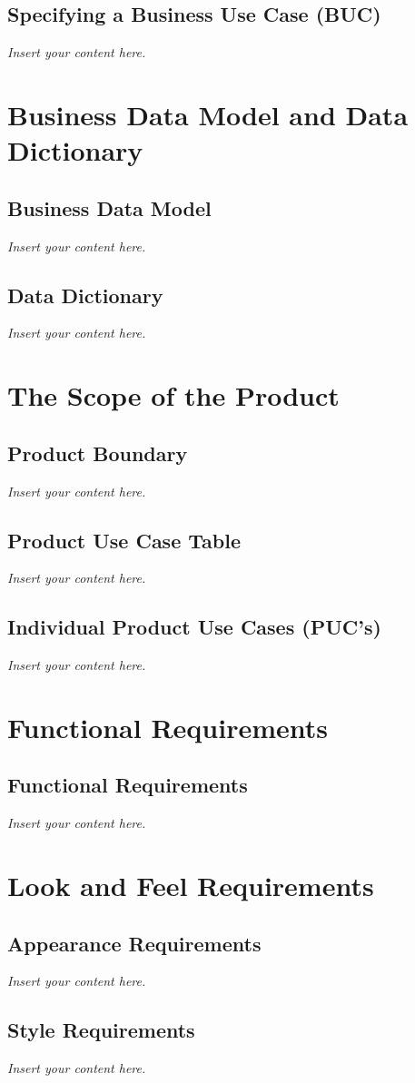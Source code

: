\documentclass[12pt]{article}
\newcommand{\lips}{\textit{Insert your content here.}}
\begin{document}
\subsection{Specifying a Business Use Case (BUC)}
\lips

\section{Business Data Model and Data Dictionary}
\subsection{Business Data Model}
\lips
\subsection{Data Dictionary}
\lips

\section{The Scope of the Product}
\subsection{Product Boundary}
\lips
\subsection{Product Use Case Table}
\lips
\subsection{Individual Product Use Cases (PUC's)}
\lips

\section{Functional Requirements}
\subsection{Functional Requirements}
\lips

\section{Look and Feel Requirements}
\subsection{Appearance Requirements}
\lips
\subsection{Style Requirements}
\lips
\end{document}

